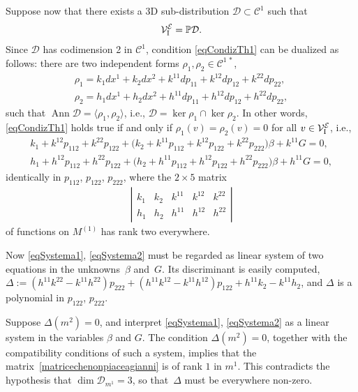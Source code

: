 \documentclass[10pt,a4paper]{amsart}
\newcommand{\C}{\mathcal{C}}
\newcommand{\D}{\mathcal{D}}
\newcommand{\MM}{\mathcal{V}_{\textrm{\normalfont I}}}
\newcommand{\E}{\mathcal{E}}
\newcommand{\Ann}{\operatorname{Ann}}
\renewcommand{\P}{\mathbb{P}}
\numberwithin{equation}{section}
\begin{document}
Suppose now that there exists a 3D sub-distribution $\D\subset\C ^1$ such that
\begin{gather}\label{eqCondizTh1}
\MM^\E=\P \D.
\end{gather}
Since $\D$ has codimension 2 in $\C ^1$, condition \eqref{eqCondizTh1} can be dualized as follows: there are two independent forms $\rho_1,\rho_2\in\C ^{1\, \ast}$,
\begin{gather*}
\rho_1 = k_1dx^1+k_2dx^2+k^{11}dp_{11}+k^{12}dp_{12}+k^{22}dp_{22},%
\\
\rho_2 = h_1dx^1+h_2dx^2+h^{11}dp_{11}+h^{12}dp_{12}+h^{22}dp_{22},%
\end{gather*}
such that $\Ann\D=\langle\rho_1,\rho_2\rangle$, i.e., $\D=\ker\rho_1\cap\ker\rho_2$. In other words, \eqref{eqCondizTh1} holds true if and only if $\rho_1(v)=\rho_2(v)=0$
for all $v\in\MM^\E$, i.e.,
\begin{gather}
k_1+k^{12}p_{112}+k^{22}p_{122}+\big(k_2+k^{11}p_{112}+k^{12}p_{122}+k^{22}p_{222}\big)\beta+k^{11}G = 0,\label{eqSystema1}\\
h_1+h^{12}p_{112}+h^{22}p_{122}+\big(h_2+h^{11}p_{112}+h^{12}p_{122}+h^{22}p_{222}\big)\beta+h^{11}G = 0,\label{eqSystema2}
\end{gather}
identically in $p_{112}$, $p_{122}$, $p_{222}$,
where the $2\times 5$ matrix{\samepage
 \begin{gather}\label{matricechenonpiaceagianni}
\left|\begin{matrix}k_1 & k_2 & k^{11} & k^{12} & k^{22} \\h_1 & h_2 & h^{11} & h^{12} & h^{22}\end{matrix}\right|
\end{gather}
of functions on $M^{(1)}$ has rank two everywhere.}

Now \eqref{eqSystema1}, \eqref{eqSystema2} must be regarded as linear system of two equations in the unknowns~$\beta$ and~$G$. Its discriminant is easily computed,
$\Delta:=(h^{11}k^{22}-k^{11}h^{22})p_{222}+(h^{11}k^{12}-k^{11}h^{12})p_{122}+h^{11}k_2-k^{11}h_2$,
and $\Delta$ is a polynomial in $p_{122}$, $p_{222}$.

Suppose $\Delta(m^2)=0$, and interpret \eqref{eqSystema1}, \eqref{eqSystema2} as a linear system in the variables $\beta$ and $G$. The condition $\Delta(m^2)=0$, together with the compatibility conditions of such a system, implies that the matrix~\eqref{matricechenonpiaceagianni} is of rank $1$ in $m^1$. This contradicts the hypothesis that $\dim\D_{m^1}=3$, so that~$\Delta$ must be everywhere non-zero.
\end{document}

